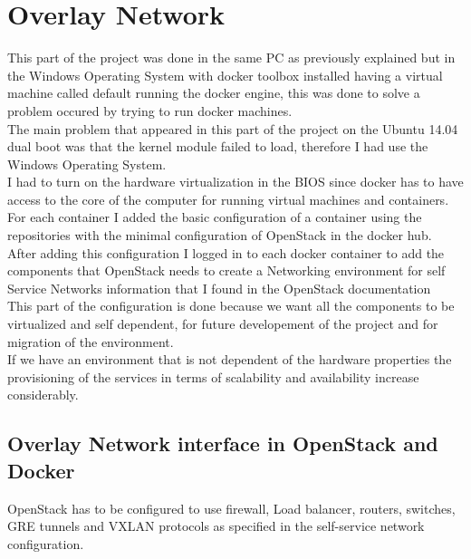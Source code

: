 \chapter{Overlay Network} %

This part of the project was done in the same PC as previously explained but in the Windows Operating System with docker toolbox installed having a virtual machine called default running the docker engine, this was done to solve a problem occured by trying to run docker machines. \\

The main problem that appeared in this part of the project on the Ubuntu 14.04 dual boot was that the kernel module failed to load,  therefore I had use the Windows Operating System.\\

I had to turn on the hardware virtualization in the BIOS since docker has to have access to the core of the computer for running virtual machines and containers.\\

For each container I added the basic configuration of a container using the repositories with the minimal configuration of OpenStack in the docker hub.\cite{8} \\

After adding this configuration I logged in to each docker container to add the components that OpenStack needs to create a Networking environment for self Service Networks information that I found in the OpenStack documentation\cite{9} \\

This part of the configuration is done because we want all the components to be virtualized and self dependent, for future developement of the project and for migration of the environment.\\

If we have an environment that is not dependent of the hardware properties the provisioning of the services in terms of scalability and availability increase considerably.\\

\section{Overlay Network interface in OpenStack and Docker} 

OpenStack has to be configured to use firewall, Load balancer, routers, switches, GRE tunnels and VXLAN protocols as specified in the self-service network configuration.\\

